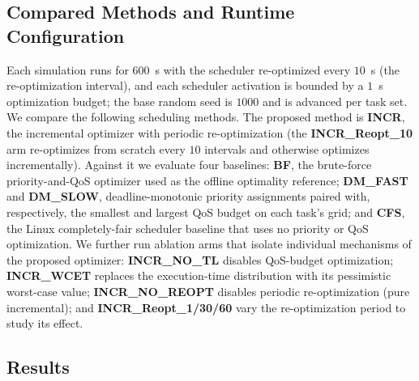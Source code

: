     \subsection{Compared Methods and Runtime Configuration}
    \label{section: sim_compared_methods}
    Each simulation runs for $600$~s with the scheduler re-optimized every $10$~s (the re-optimization interval), and each scheduler activation is bounded by a $1$~s optimization budget; the base random seed is $1000$ and is advanced per task set.
    We compare the following scheduling methods. The proposed method is \textbf{INCR}, the incremental optimizer with periodic re-optimization (the \textbf{INCR\_Reopt\_10} arm re-optimizes from scratch every $10$ intervals and otherwise optimizes incrementally).
    Against it we evaluate four baselines: \textbf{BF}, the brute-force priority-and-QoS optimizer used as the offline optimality reference; \textbf{DM\_FAST} and \textbf{DM\_SLOW}, deadline-monotonic priority assignments paired with, respectively, the smallest and largest QoS budget on each task's grid; and \textbf{CFS}, the Linux completely-fair scheduler baseline that uses no priority or QoS optimization.
    We further run ablation arms that isolate individual mechanisms of the proposed optimizer: \textbf{INCR\_NO\_TL} disables QoS-budget optimization; \textbf{INCR\_WCET} replaces the execution-time distribution with its pessimistic worst-case value; \textbf{INCR\_NO\_REOPT} disables periodic re-optimization (pure incremental); and \textbf{INCR\_Reopt\_1/30/60} vary the re-optimization period to study its effect.

    \subsection{Results}
    
